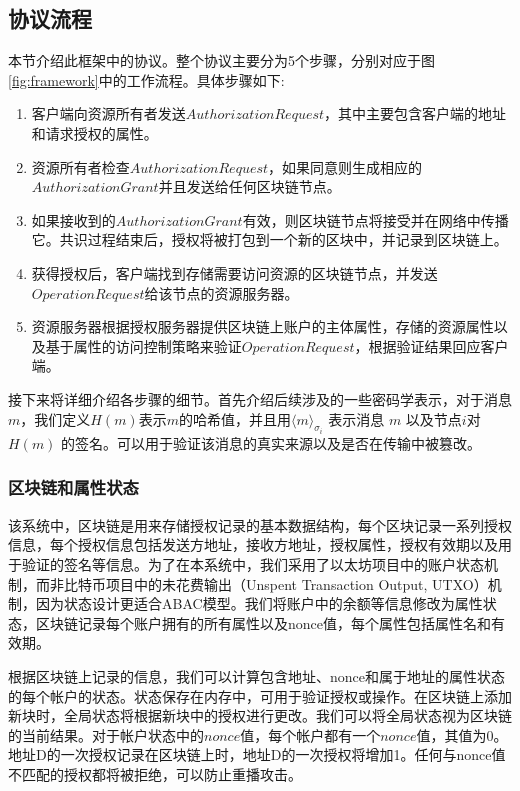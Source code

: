 \subsection{协议流程}
\label{sec:protocols}
本节介绍此框架中的协议。整个协议主要分为5个步骤，分别对应于图\ref{fig:framework}中的工作流程。具体步骤如下:

\begin{enumerate}
  \item 客户端向资源所有者发送$Authorization Request$，其中主要包含客户端的地址和请求授权的属性。
  \item 资源所有者检查$Authorization Request$，如果同意则生成相应的$Authorization Grant$并且发送给任何区块链节点。
  \item 如果接收到的$Authorization Grant$有效，则区块链节点将接受并在网络中传播它。共识过程结束后，授权将被打包到一个新的区块中，并记录到区块链上。
  \item 获得授权后，客户端找到存储需要访问资源的区块链节点，并发送$Operation Request$给该节点的资源服务器。
  \item 资源服务器根据授权服务器提供区块链上账户的主体属性，存储的资源属性以及基于属性的访问控制策略来验证$Operation Request$，根据验证结果回应客户端。
\end{enumerate}

接下来将详细介绍各步骤的细节。首先介绍后续涉及的一些密码学表示，对于消息$m$，我们定义$H(m)$表示$m$的哈希值，并且用$\langle m \rangle_{\sigma_{i}}$ 表示消息 $m$ 以及节点$i$对 $H(m)$ 的签名。可以用于验证该消息的真实来源以及是否在传输中被篡改。

\subsubsection{区块链和属性状态}

该系统中，区块链是用来存储授权记录的基本数据结构，每个区块记录一系列授权信息，每个授权信息包括发送方地址，接收方地址，授权属性，授权有效期以及用于验证的签名等信息。为了在本系统中，我们采用了以太坊项目中的账户状态机制，而非比特币项目中的未花费输出（Unspent Transaction Output, UTXO）机制，因为状态设计更适合ABAC模型。我们将账户中的余额等信息修改为属性状态，区块链记录每个账户拥有的所有属性以及nonce值，每个属性包括属性名和有效期。

根据区块链上记录的信息，我们可以计算包含地址、nonce和属于地址的属性状态的每个帐户的状态。状态保存在内存中，可用于验证授权或操作。在区块链上添加新块时，全局状态将根据新块中的授权进行更改。我们可以将全局状态视为区块链的当前结果。对于帐户状态中的$nonce$值，每个帐户都有一个$nonce$值，其值为0。地址D的一次授权记录在区块链上时，地址D的一次授权将增加1。任何与nonce值不匹配的授权都将被拒绝，可以防止重播攻击。

